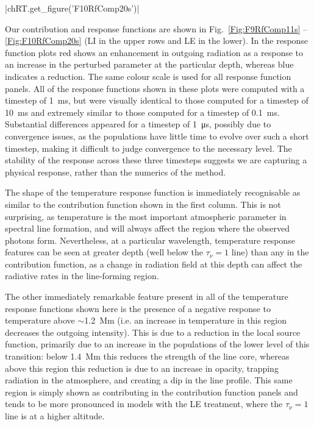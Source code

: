 \py[TimeDepRT]|chRT.get_figure('F10RfComp20s')|

Our contribution and response functions are shown in Fig.~\ref{Fig:F9RfComp11s} -- \ref{Fig:F10RfComp20s} (LI in the upper rows and LE in the lower).
In the response function plots red shows an enhancement in outgoing radiation as a response to an increase in the perturbed parameter at the particular depth, whereas blue indicates a reduction.
The same colour scale is used for all response function panels.
All of the response functions shown in these plots were computed with a timestep of \SI{1}{\milli\second}, but were visually identical to those computed for a timestep of \SI{10}{\milli\second} and extremely similar to those computed for a timestep of \SI{0.1}{\milli\second}.
Substantial differences appeared for a timestep of \SI{1}{\micro\s}, possibly due to convergence issues, as the populations have little time to evolve over such a short timestep, making it difficult to judge convergence to the necessary level.
The stability of the response across these three timesteps suggests we are capturing a physical response, rather than the numerics of the method.

The shape of the temperature response function is immediately recognisable as similar to the contribution function shown in the first column.
This is not surprising, as temperature is the most important atmospheric parameter in spectral line formation, and will always affect the region where the observed photons form.
Nevertheless, at a particular wavelength, temperature response features can be seen at greater depth (well below the $\tau_\nu=1$ line) than any in the contribution function, as a change in radiation field at this depth can affect the radiative rates in the line-forming region.

The other immediately remarkable feature present in all of the temperature response functions shown here is the presence of a negative response to temperature above $\sim$\SI{1.2}{\mega\metre} (i.e. an increase in temperature in this region decreases the outgoing intensity).
This is due to a reduction in the local source function, primarily due to an increase in the populations of the lower level of this transition: below \SI{1.4}{\mega\m} this reduces the strength of the line core, whereas above this region this reduction is due to an increase in opacity, trapping radiation in the atmosphere, and creating a dip in the line profile.
This same region is simply shown as contributing in the contribution function panels and tends to be more pronounced in models with the LE treatment, where the $\tau_\nu=1$ line is at a higher altitude.

